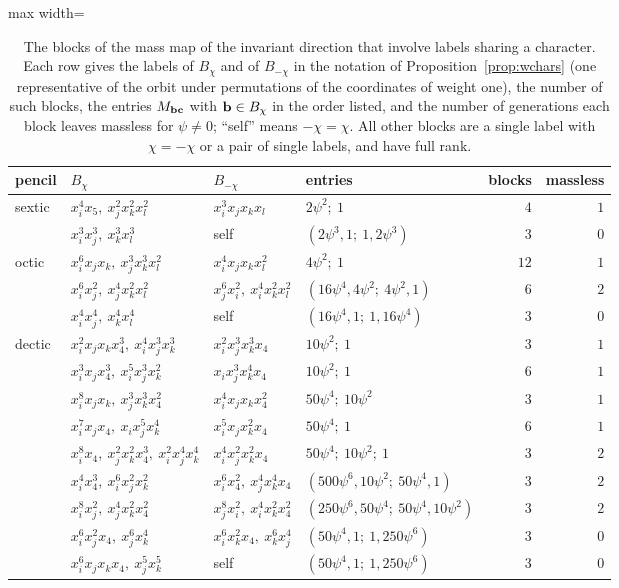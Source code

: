 \begin{table}[t]
\caption{The blocks of the mass map of the invariant direction that
involve labels sharing a character. Each row gives the labels of
$B_\chi$ and of $B_{-\chi}$ in the notation of
Proposition~\ref{prop:wchars} (one representative of the orbit under
permutations of the coordinates of weight one), the number of such blocks,
the entries $M_{\mathbf{b}\mathbf{c}}$ with $\mathbf{b}\in B_\chi$ in the order listed, and the
number of generations each block leaves massless for $\psi\ne0$; ``self''
means $-\chi=\chi$. All other blocks are a single label with $\chi=-\chi$
or a pair of single labels, and have full rank.}
\label{tab:wblocks}
\centering
\begin{adjustbox}{max width=\linewidth}\begin{tabular}{llllrr}
\toprule
pencil & $B_\chi$ & $B_{-\chi}$ & entries & blocks & massless\\
\midrule
sextic & $x_i^4x_5,\ x_j^2x_k^2x_l^2$ & $x_i^3x_jx_kx_l$ &
$2\psi^2;\ 1$ & $4$ & $1$\\
 & $x_i^3x_j^3,\ x_k^3x_l^3$ & self & $(2\psi^3,1;\ 1,2\psi^3)$ & $3$ & $0$\\
\midrule
octic & $x_i^6x_jx_k,\ x_j^3x_k^3x_l^2$ & $x_i^4x_jx_kx_l^2$ &
$4\psi^2;\ 1$ & $12$ & $1$\\
 & $x_i^6x_j^2,\ x_j^4x_k^2x_l^2$ & $x_j^6x_i^2,\ x_i^4x_k^2x_l^2$ &
$(16\psi^4,4\psi^2;\ 4\psi^2,1)$ & $6$ & $2$\\
 & $x_i^4x_j^4,\ x_k^4x_l^4$ & self & $(16\psi^4,1;\ 1,16\psi^4)$ & $3$ & $0$\\
\midrule
dectic & $x_i^2x_jx_kx_4^3,\ x_i^4x_j^3x_k^3$ & $x_i^2x_j^3x_k^3x_4$ &
$10\psi^2;\ 1$ & $3$ & $1$\\
 & $x_i^3x_jx_4^3,\ x_i^5x_j^3x_k^2$ & $x_ix_j^3x_k^4x_4$ &
$10\psi^2;\ 1$ & $6$ & $1$\\
 & $x_i^8x_jx_k,\ x_j^3x_k^3x_4^2$ & $x_i^4x_jx_kx_4^2$ &
$50\psi^4;\ 10\psi^2$ & $3$ & $1$\\
 & $x_i^7x_jx_4,\ x_ix_j^5x_k^4$ & $x_i^5x_jx_k^2x_4$ &
$50\psi^4;\ 1$ & $6$ & $1$\\
 & $x_i^8x_4,\ x_j^2x_k^2x_4^3,\ x_i^2x_j^4x_k^4$ & $x_i^4x_j^2x_k^2x_4$ &
$50\psi^4;\ 10\psi^2;\ 1$ & $3$ & $2$\\
 & $x_i^4x_4^3,\ x_i^6x_j^2x_k^2$ & $x_i^6x_4^2,\ x_j^4x_k^4x_4$ &
$(500\psi^6,10\psi^2;\ 50\psi^4,1)$ & $3$ & $2$\\
 & $x_i^8x_j^2,\ x_j^4x_k^2x_4^2$ & $x_j^8x_i^2,\ x_i^4x_k^2x_4^2$ &
$(250\psi^6,50\psi^4;\ 50\psi^4,10\psi^2)$ & $3$ & $2$\\
 & $x_i^6x_j^2x_4,\ x_j^6x_k^4$ & $x_i^6x_k^2x_4,\ x_k^6x_j^4$ &
$(50\psi^4,1;\ 1,250\psi^6)$ & $3$ & $0$\\
 & $x_i^6x_jx_kx_4,\ x_j^5x_k^5$ & self & $(50\psi^4,1;\ 1,250\psi^6)$ & $3$ & $0$\\
\bottomrule
\end{tabular}\end{adjustbox}
\end{table}

